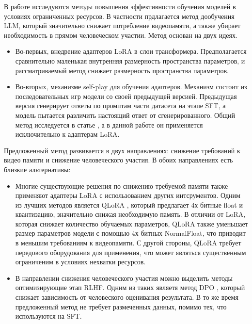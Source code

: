 \documentclass[12pt, twoside]{article}
\begin{document}
В работе исследуются методы повышения эффективности обучения моделей в условиях ограниченных ресурсов. В частности прдлагается метод дообучения LLM, который значительно снижает потребление видеопамяти, а также убирает необходимость в прямом человеческом участии. Метод основан на двух идеях. 

\begin{itemize}
  \item Во-первых, внедрение адаптеров LoRA в слои трансформера. Предполагается сравнительно маленькая внутренняя размерность пространства параметров, и рассматриваемый метод снижает размерность пространства параметров. 
  
  \vspace{8}
   
  \item Во-вторых, механизме self-play для обучения адаптеров. Механизм состоит из последовательных игр модели со своей предыдущей версией. Предыдущая версия генерирует ответы по промптам части датасета на этапе SFT, а модель пытается различить настоящий ответ от сгенерированного. Общий метод исследуется в статье \parencite{Chen2024a}, а  в данной работе он применяется исключительно к адаптерам LoRA. 
\end{itemize}

Предложенный метод развивается в двух направлениях: снижение требований к видео памяти и снижение человеческого участия. В обоих направлениях есть близкие альтернативы:

\begin{itemize}
  \item Многие существующие решения по снижению требуемой памяти также применяют адаптеры LoRA с использованием других интсрументов. Одним из лучших методов является QLoRA \parencite{Dettmers2023}, который предлагает 4х битные float и квантизацию, значительно снижая необходимую память. В отличии от LoRA, которая снижает количество обучаемых параметров, QLoRA также уменьшает размер параметров модели с помощью 4х битных NormalFloat, что приводит в меньшим требованиям к видеопамяти. С другой стороны, QLoRA требует передового оборудования для применения, что может являться существенным ограниченим в условиях нехватки ресурсов. 

  \vspace{8}
  
  \item В направлении снижения человеческого участия можно выделить методы оптимизирующие этап RLHF. Одним из таких являетя метод DPO \parencite{Rafailov2023a}, который снижает зависимость от человеского оценивания результата. В то же время предложенный метод не требует размеченных данных, помимо тех, что используются на SFT.
\end{itemize}
\end{document}
